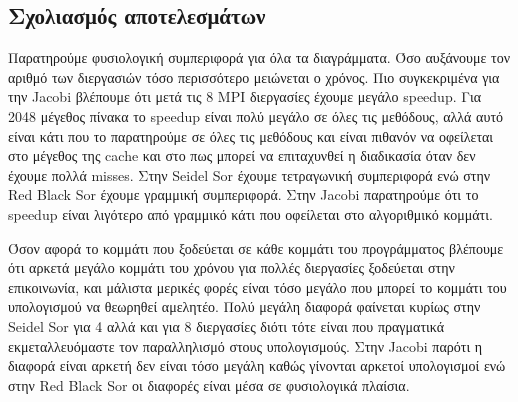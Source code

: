 \documentclass[11pt,a4paper]{article}
\begin{document}
\begin{figure}
\begin{subfigure}
        \end{subfigure}
\end{figure}
\newpage
\clearpage
\subsection*{Σχολιασμός αποτελεσμάτων}
Παρατηρούμε φυσιολογική συμπεριφορά για όλα τα διαγράμματα. Όσο αυξάνουμε τον αριθμό των διεργασιών τόσο περισσότερο μειώνεται ο χρόνος. Πιο συγκεκριμένα για την
Jacobi βλέπουμε ότι μετά τις 8 MPI διεργασίες έχουμε μεγάλο speedup. Για 2048 μέγεθος πίνακα το speedup είναι πολύ μεγάλο σε όλες τις μεθόδους, αλλά αυτό είναι 
κάτι που το παρατηρούμε σε όλες τις μεθόδους και είναι πιθανόν να οφείλεται στο μέγεθος της cache και στο πως μπορεί να επιταχυνθεί η διαδικασία 
όταν δεν έχουμε πολλά misses. Στην Seidel Sor έχουμε τετραγωνική συμπεριφορά ενώ στην Red Black Sor έχουμε γραμμική συμπεριφορά. Στην Jacobi παρατηρούμε 
ότι το speedup είναι λιγότερο από γραμμικό κάτι που οφείλεται στο αλγοριθμικό κομμάτι.

Όσον αφορά το κομμάτι που ξοδεύεται σε κάθε κομμάτι του προγράμματος βλέπουμε ότι αρκετά μεγάλο κομμάτι του χρόνου για πολλές διεργασίες ξοδεύεται στην επικοινωνία,
και μάλιστα μερικές φορές είναι τόσο μεγάλο που μπορεί το κομμάτι του υπολογισμού να θεωρηθεί αμελητέο. Πολύ μεγάλη διαφορά φαίνεται κυρίως στην Seidel Sor για 4
αλλά και για 8 διεργασίες διότι τότε είναι που πραγματικά εκμεταλλευόμαστε τον παραλληλισμό στους υπολογισμούς. Στην Jacobi παρότι η διαφορά είναι αρκετή δεν είναι
τόσο μεγάλη καθώς γίνονται αρκετοί υπολογισμοί ενώ στην Red Black Sor οι διαφορές είναι μέσα σε φυσιολογικά πλαίσια.
\end{document}
